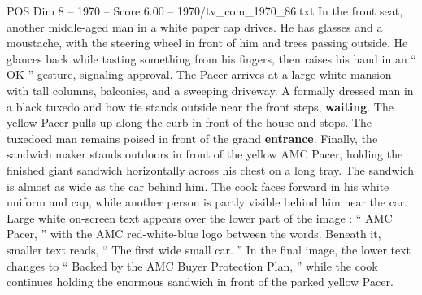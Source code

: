 \begin{textsample}{POS Dim 8 – 1970 – Score 6.00 – 1970/tv\_com\_1970\_86.txt}
In the front seat, another middle-aged man in a white paper cap drives.
He has glasses and a moustache, with the steering wheel in front of him and trees passing outside.
He glances back while tasting something from his fingers, then raises his hand in an “ OK ” gesture, signaling approval.
The Pacer arrives at a large white mansion with tall columns, balconies, and a sweeping driveway.
A formally dressed man in a black tuxedo and bow tie stands outside near the front steps, \textbf{waiting}.
The yellow Pacer pulls up along the curb in front of the house and stops.
The tuxedoed man remains poised in front of the grand \textbf{entrance}.
Finally, the sandwich maker stands outdoors in front of the yellow AMC Pacer, holding the finished giant sandwich horizontally across his chest on a long tray.
The sandwich is almost as wide as the car behind him.
The cook faces forward in his white uniform and cap, while another person is partly visible behind him near the car.
Large white on-screen text appears over the lower part of the image : “ AMC Pacer, ” with the AMC red-white-blue logo between the words.
Beneath it, smaller text reads, “ The first wide small car. ” In the final image, the lower text changes to “ Backed by the AMC Buyer Protection Plan, ” while the cook continues holding the enormous sandwich in front of the parked yellow Pacer.

\end{textsample}
